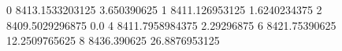0 8413.1533203125 3.650390625
1 8411.126953125 1.6240234375
2 8409.5029296875 0.0
4 8411.7958984375 2.29296875
6 8421.75390625 12.2509765625
8 8436.390625 26.8876953125

